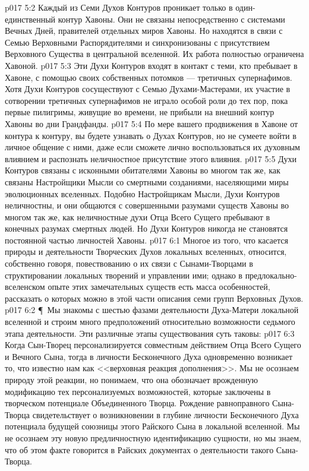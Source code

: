 \vs p017 5:2 Каждый из Семи Духов Контуров проникает только в один\hyp{}единственный контур Хавоны. Они не связаны непосредственно с системами Вечных Дней, правителей отдельных миров Хавоны. Но находятся в связи с Семью Верховными Распорядителями и синхронизованы с присутствием Верховного Существа в центральной вселенной. Их работа полностью ограничена Хавоной.
\vs p017 5:3 Эти Духи Контуров входят в контакт с теми, кто пребывает в Хавоне, с помощью своих собственных потомков --- третичных супернафимов. Хотя Духи Контуров сосуществуют с Семью Духами\hyp{}Мастерами, их участие в сотворении третичных супернафимов не играло особой роли до тех пор, пока первые пилигримы, живущие во времени, не прибыли на внешний контур Хавоны во дни Грандфанды.
\vs p017 5:4 По мере вашего продвижения в Хавоне от контура к контуру, вы будете узнавать о Духах Контуров, но не сумеете войти в личное общение с ними, даже если сможете лично воспользоваться их духовным влиянием и распознать неличностное присутствие этого влияния.
\vs p017 5:5 Духи Контуров связаны с исконными обитателями Хавоны во многом так же, как связаны Настройщики Мысли со смертными созданиями, населяющими миры эволюционных вселенных. Подобно Настройщикам Мысли, Духи Контуров неличностны, и они общаются с совершенными разумами существ Хавоны во многом так же, как неличностные духи Отца Всего Сущего пребывают в конечных разумах смертных людей. Но Духи Контуров никогда не становятся постоянной частью личностей Хавоны.
\vs p017 6:1 Многое из того, что касается природы и деятельности Творческих Духов локальных вселенных, относится, собственно говоря, повествованию о их связи с Сынами\hyp{}Творцами в структировании локальных творений и управлении ими; однако в предлокально\hyp{}вселенском опыте этих замечательных существ есть масса особенностей, рассказать о которых можно в этой части описания семи групп Верховных Духов.
\vs p017 6:2 \P\ Мы знакомы с шестью фазами деятельности Духа\hyp{}Матери локальной вселенной и строим много предположений относительно возможности седьмого этапа деятельности. Эти различные этапы существования суть таковы:
\vs p017 6:3 \bibnobreakspace {} Когда Сын\hyp{}Творец персонализируется совместным действием Отца Всего Сущего и Вечного Сына, тогда в личности Бесконечного Духа одновременно возникает то, что известно нам как <<верховная реакция дополнения>>. Мы не осознаем природу этой реакции, но понимаем, что она обозначает врожденную модификацию тех персонализуемых возможностей, которые заключены в творческом потенциале Объединенного Творца. Рождение равноправного Сына\hyp{}Творца свидетельствует о возникновении в глубине личности Бесконечного Духа потенциала будущей союзницы этого Райского Сына в локальной вселенной. Мы не осознаем эту новую предличностную идентификацию сущности, но мы знаем, что об этом факте говорится в Райских документах о деятельности такого Сына\hyp{}Творца.
